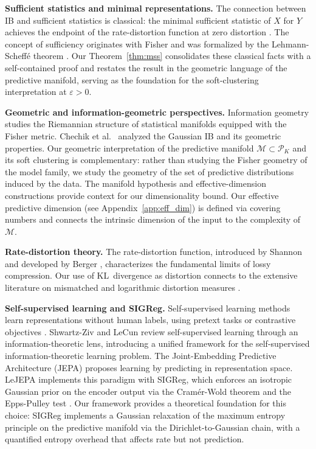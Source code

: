\documentclass[11pt]{article}
\begin{document}
\medskip
\noindent\textbf{Sufficient statistics and minimal representations.}
The connection between IB and sufficient statistics is classical:
the minimal sufficient statistic of $X$ for $Y$ achieves the endpoint
of the rate-distortion function at zero distortion
\cite{tishby1999information,cover2006elements}.
The concept of sufficiency originates with Fisher
\cite{fisher1922mathematical} and was formalized by the
Lehmann-Scheff\'e theorem \cite{lehmann1950completeness}.
Our Theorem~\ref{thm:mss} consolidates these classical facts with a
self-contained proof and restates the result in the geometric
language of the predictive manifold, serving as the foundation for
the soft-clustering interpretation at $\varepsilon>0$.

\medskip
\noindent\textbf{Geometric and information-geometric perspectives.}
Information geometry \cite{amari2016information} studies the
Riemannian structure of statistical manifolds equipped with the
Fisher metric.
Chechik et al.\ \cite{chechik2005information} analyzed the Gaussian
IB and its geometric properties.
Our geometric interpretation of the predictive manifold
$\mathcal{M}\subset\mathcal{P}_K$ and its soft clustering is
complementary: rather than studying the Fisher geometry of the model
family, we study the geometry of the set of predictive distributions
induced by the data.
The manifold hypothesis \cite{fefferman2016testing,pope2021intrinsic}
and effective-dimension constructions \cite{abbas2020effective}
provide context for our dimensionality bound. Our effective predictive
dimension (see Appendix~\ref{app:eff_dim}) is defined via covering
numbers and connects the intrinsic dimension of the input to the
complexity of $\mathcal{M}$.

\medskip
\noindent\textbf{Rate-distortion theory.}
The rate-distortion function, introduced by Shannon
\cite{shannon1959coding} and developed by Berger
\cite{berger1971rate}, characterizes the fundamental limits of lossy
compression.
Our use of KL~divergence as distortion connects to the extensive
literature on mismatched and logarithmic distortion measures
\cite{cover2006elements}.

\medskip
\noindent\textbf{Self-supervised learning and SIGReg.}
Self-supervised learning methods learn representations without
human labels, using pretext tasks or contrastive objectives
\cite{chen2020simple,grill2020bootstrap,caron2021emerging}.
Shwartz-Ziv and LeCun \cite{shwartzziv2024compress} review
self-supervised learning through an information-theoretic lens,
introducing a unified framework for the self-supervised
information-theoretic learning problem.
The Joint-Embedding Predictive Architecture (JEPA)
\cite{lecun2022path} proposes learning by predicting in
representation space.
LeJEPA \cite{balestriero2025lejepa} implements this paradigm with SIGReg, which
enforces an isotropic Gaussian prior on the encoder output via the
Cram\'er-Wold theorem and the Epps-Pulley test \cite{epps1983test}.
Our framework provides a theoretical foundation for this choice: SIGReg
implements a Gaussian relaxation of the maximum entropy principle on
the predictive manifold via the Dirichlet-to-Gaussian chain, with a
quantified entropy overhead that affects rate but not prediction.
\end{document}
